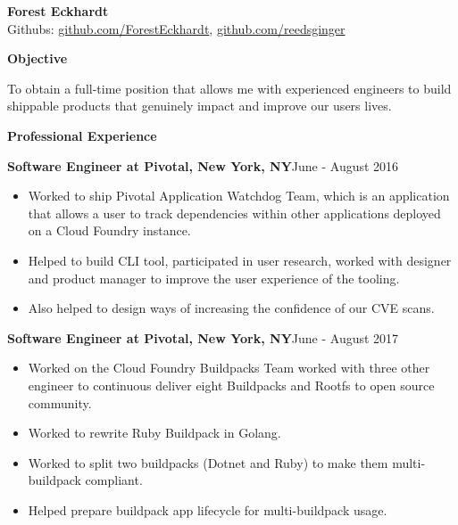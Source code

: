 \documentclass[10pt,a4papaer]{article}
\begin{document}
	{\selectfont
		
		\begin{center}	
			{\huge\textbf{Forest Eckhardt}} \\
			Githubs:
			\href{http://www.github.com/ForestEckhardt}{github.com/ForestEckhardt}, \href{http://www.github.com/reedsginger}{github.com/reedsginger}  \\
		\end{center}
		
		{\noindent\textbf{Objective}}\vspace*{-20px}\\
		
		\noindent\makebox[\linewidth]{\rule{\textwidth}{1.2pt}}
		
		\setlength{\leftskip}{15pt}
		
		{\noindent To obtain a full-time position that allows me with experienced engineers to build shippable products that genuinely impact and improve our users lives.}\\
		
		\setlength{\leftskip}{0pt}
		
		{\noindent\textbf{Professional Experience}}\vspace*{-20px}\\
		
		\noindent\makebox[\linewidth]{\rule{\textwidth}{1.2pt}}
		
		\setlength{\leftskip}{15pt}
		
		{\noindent\textbf{Software Engineer at Pivotal, New York, NY}}{\hfill June - August 2016}
		
		\begin{itemize}[noitemsep, topsep=0pt]
			\item Worked to ship Pivotal Application Watchdog Team, which is an application that allows a user to track dependencies within other applications deployed on a Cloud Foundry instance. 
			\item Helped to build CLI tool, participated in user research, worked with designer and product manager to improve the user experience of the tooling. \item Also helped to design ways of increasing the confidence of our CVE scans.\\
		\end{itemize}
		
		{\noindent\textbf{Software Engineer at Pivotal, New York, NY}}{\hfill June - August 2017}
		\begin{itemize}[noitemsep, topsep=0pt]
			\item Worked on the Cloud Foundry Buildpacks Team worked with three other engineer to continuous deliver eight Buildpacks and Rootfs to open source community. 
			\item Worked to rewrite Ruby Buildpack in Golang.
			\item Worked to split two buildpacks (Dotnet and Ruby) to make them multi-buildpack compliant.
			\item Helped prepare buildpack app lifecycle for multi-buildpack usage.\\
			

\end{itemize}}
\end{document}
